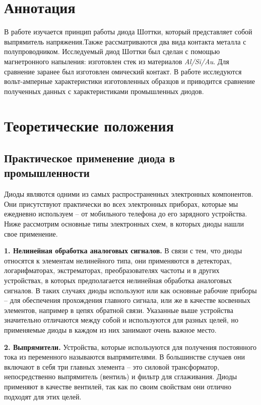 \documentclass[a4paper]{article}
\begin{document}
\section{Аннотация}

В работе изучается принцип работы диода Шоттки, который представляет собой выпрямитель напряжения.Также рассматриваются два вида контакта металла с полупроводником. Исследуемый диод Шоттки был сделан с помощью магнетронного напыления: изготовлен стек из материалов \textit{Al/Si/Au}. Для сравнение заранее был изготовлен омический контакт. В работе исследуются вольт-амперные характеристики изготовленных образцов и приводится сравнение полученных данных с характеристиками промышленных диодов. 

\section{Теоретические положения}
\subsection*{Практическое применение диода в промышленности}

Диоды являются одними из самых распространенных электронных компонентов. Они присутствуют практически во всех электронных приборах, которые мы ежедневно используем – от мобильного телефона до его зарядного устройства. Ниже рассмотрим основные типы электронных схем, в которых диоды нашли свое применение.

\textbf{1. Нелинейная обработка аналоговых сигналов.}
В связи с тем, что диоды относятся к элементам нелинейного типа, они применяются в детекторах, логарифматорах, экстрематорах, преобразователях частоты и в других устройствах, в которых предполагается нелинейная обработка аналоговых сигналов. В таких случаях диоды используют или как основные рабочие приборы – для обеспечения прохождения главного сигнала, или же в качестве косвенных элементов, например в цепях обратной связи. Указанные выше устройства значительно отличаются между собой и используются для разных целей, но применяемые диоды в каждом из них занимают очень важное место.

\textbf{2. Выпрямители.}
Устройства, которые используются для получения постоянного тока из переменного называются выпрямителями. В большинстве случаев они включают в себя три главных элемента – это силовой трансформатор, непосредственно выпрямитель (вентиль) и фильтр для сглаживания. Диоды применяют в качестве вентилей, так как по своим свойствам они отлично подходят для этих целей.
\end{document}

